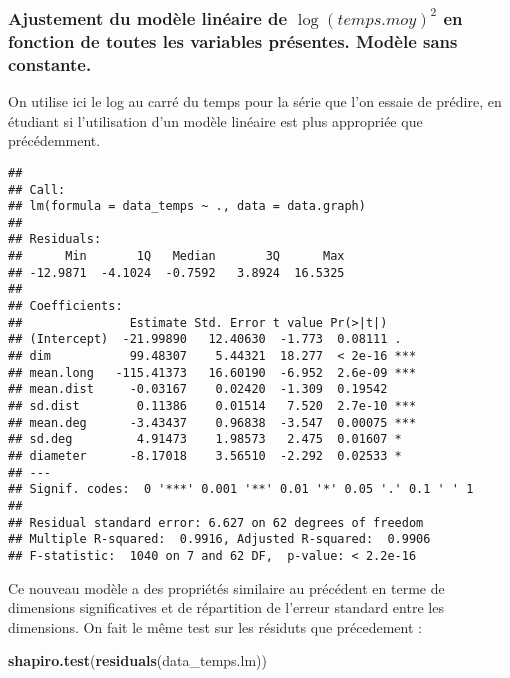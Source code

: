 \documentclass[
]{article}
\newenvironment{Shaded}{\begin{snugshade}}{\end{snugshade}}
\newcommand{\KeywordTok}[1]{\textcolor[rgb]{0.13,0.29,0.53}{\textbf{#1}}}
\newcommand{\NormalTok}[1]{#1}
\begin{document}
\hypertarget{ajustement-du-moduxe8le-linuxe9aire-de-logtemps.moy2-en-fonction-de-toutes-les-variables-pruxe9sentes.-moduxe8le-sans-constante.}{%
\subsubsection{\texorpdfstring{Ajustement du modèle linéaire de
\(\log(temps.moy)^2\) en fonction de toutes les variables présentes.
Modèle sans
constante.}{Ajustement du modèle linéaire de \textbackslash log(temps.moy)\^{}2 en fonction de toutes les variables présentes. Modèle sans constante.}}\label{ajustement-du-moduxe8le-linuxe9aire-de-logtemps.moy2-en-fonction-de-toutes-les-variables-pruxe9sentes.-moduxe8le-sans-constante.}}

On utilise ici le log au carré du temps pour la série que l'on essaie de
prédire, en étudiant si l'utilisation d'un modèle linéaire est plus
appropriée que précédemment.

\begin{verbatim}
## 
## Call:
## lm(formula = data_temps ~ ., data = data.graph)
## 
## Residuals:
##      Min       1Q   Median       3Q      Max 
## -12.9871  -4.1024  -0.7592   3.8924  16.5325 
## 
## Coefficients:
##               Estimate Std. Error t value Pr(>|t|)    
## (Intercept)  -21.99890   12.40630  -1.773  0.08111 .  
## dim           99.48307    5.44321  18.277  < 2e-16 ***
## mean.long   -115.41373   16.60190  -6.952  2.6e-09 ***
## mean.dist     -0.03167    0.02420  -1.309  0.19542    
## sd.dist        0.11386    0.01514   7.520  2.7e-10 ***
## mean.deg      -3.43437    0.96838  -3.547  0.00075 ***
## sd.deg         4.91473    1.98573   2.475  0.01607 *  
## diameter      -8.17018    3.56510  -2.292  0.02533 *  
## ---
## Signif. codes:  0 '***' 0.001 '**' 0.01 '*' 0.05 '.' 0.1 ' ' 1
## 
## Residual standard error: 6.627 on 62 degrees of freedom
## Multiple R-squared:  0.9916, Adjusted R-squared:  0.9906 
## F-statistic:  1040 on 7 and 62 DF,  p-value: < 2.2e-16
\end{verbatim}

Ce nouveau modèle a des propriétés similaire au précédent en terme de
dimensions significatives et de répartition de l'erreur standard entre
les dimensions. On fait le même test sur les résiduts que précedement :

\begin{Shaded}
\begin{Highlighting}[]
\KeywordTok{shapiro.test}\NormalTok{(}\KeywordTok{residuals}\NormalTok{(data_temps.lm))}
\end{Highlighting}
\end{Shaded}
\end{document}
